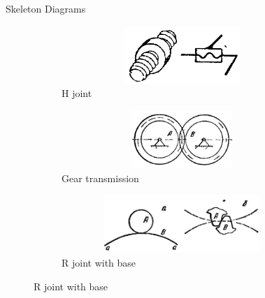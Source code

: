 \documentclass[aspectratio=169]{beamer}
\begin{document}
\begin{frame}[t]{Skeleton Diagrams}
\begin{figure}[H]
    \begin{subfigure}{0.32\textwidth}
        \centering\includegraphics[height=2.2cm,width=1\textwidth,keepaspectratio]{H_sd.png}
        \caption*{H joint}
    \end{subfigure}
    \begin{subfigure}{0.32\textwidth}
        \centering\includegraphics[height=2.2cm,width=1\textwidth,keepaspectratio]{Tooth_sd.png}
        \caption*{Gear transmission}
    \end{subfigure}
    \begin{subfigure}{0.32\textwidth}
        \centering\includegraphics[height=2.2cm,width=1\textwidth,keepaspectratio]{Higher_sd.png}
        \caption*{R joint with base}
    \end{subfigure}
\end{figure}
\end{frame}
\end{document}
